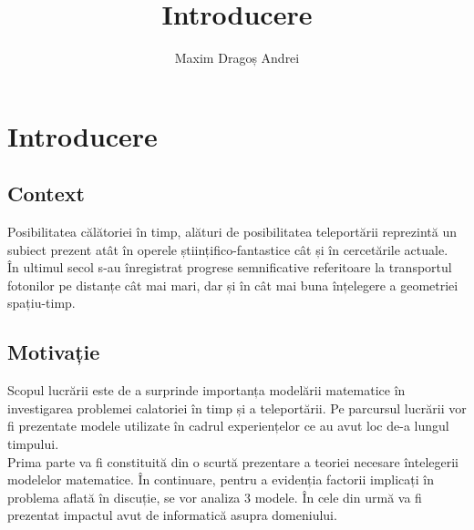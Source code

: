 \documentclass[a4paper]{article}
\title{Introducere}
\author{Maxim Dragoș Andrei}
\date{}
\begin{document}
\maketitle

\section{Introducere}
\subsection{Context}
\begin{normalsize}

\hspace{5mm}Posibilitatea călătoriei în timp, alături de posibilitatea teleportării reprezintă un subiect prezent atât în operele științifico-fantastice cât și în cercetările actuale. \\

\hspace{5mm}În ultimul secol s-au înregistrat progrese semnificative referitoare la transportul fotonilor pe distanțe cât mai mari, dar și în cât mai buna înțelegere a geometriei spațiu-timp.
\end{normalsize}

\subsection{Motivație}
\begin{normalsize}
\hspace{5mm}Scopul lucrării este de a surprinde importanța modelării matematice în investigarea problemei calatoriei în timp și a teleportării. Pe parcursul lucrării vor fi prezentate modele utilizate în cadrul experiențelor ce au avut loc de-a lungul timpului.\\ 

\hspace{5mm}Prima parte va fi constituită din o scurtă prezentare a teoriei necesare întelegerii modelelor matematice. În continuare, pentru a evidenția factorii implicați în problema aflată în discuție, se vor analiza 3 modele. În cele din urmă va fi prezentat impactul avut de informatică asupra domeniului.
\end{normalsize}
\end{document}

